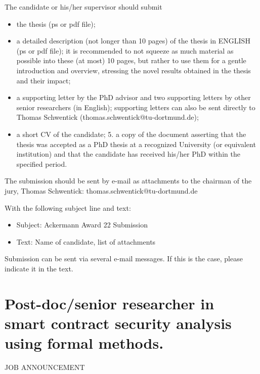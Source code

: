 \documentclass[prodmode,acmtecs]{acmsmall} %
\begin{document}
\begin{itemize}
  The candidate or his/her supervisor should submit 
 
\begin{itemize}\item  the thesis (ps or pdf file); 
\item  a detailed description (not longer than 10 pages) of the thesis in ENGLISH (ps or pdf file); it is recommended to not squeeze as much material as possible into these (at most) 10 pages, but rather to use them for a gentle introduction and overview, stressing the novel results obtained in the thesis and their impact; 
\item  a supporting letter by the PhD advisor and two supporting letters by other senior researchers (in English); supporting letters can also be sent directly to Thomas Schwentick (thomas.schwentick@tu-dortmund.de); 
\item  a short CV of the candidate; 5. a copy of the document asserting that the thesis was accepted as a PhD thesis at a recognized University (or equivalent institution) and that the candidate has received his/her PhD within the specified period.
\end{itemize} 
  The submission should be sent by e-mail as attachments to the chairman of the jury, Thomas Schwentick: thomas.schwentick@tu-dortmund.de 
 
  With the following subject line and text: 
 
\begin{itemize}\item  Subject: Ackermann Award 22 Submission 
\item  Text: Name of candidate, list of attachments
\end{itemize} 
  Submission can be sent via several e-mail messages. If this is the case, please indicate it in the text.  
 
\end{itemize}\section{Post-doc/senior researcher in smart contract security analysis using formal methods.}\label{Postdocseniorresearcherinsmartcontractsecurityanalysisusingformalmethods}JOB ANNOUNCEMENT 
\end{document}
